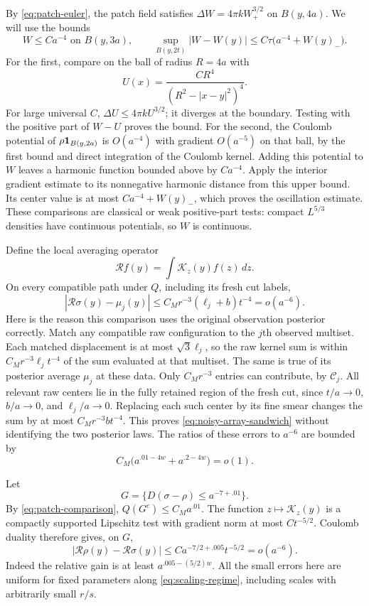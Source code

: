 By \cref{eq:patch-euler}, the patch field satisfies
$\Delta W=4\pi kW_+^{3/2}$ on $B(y,4a)$.  We will use the bounds
\begin{equation}
 W\leq Ca^{-4}\text{ on }B(y,3a),\qquad
 \sup_{B(y,2t)}|W-W(y)|
                       \leq C\tau\bigl(a^{-4}+W(y)_-\bigr).
 \label{eq:patch-field-oscillation}
\end{equation}
For the first, compare on the ball of radius $R=4a$ with
\[
 U(x)=\frac{CR^4}{(R^2-|x-y|^2)^4}.
\]
For large universal $C$, $\Delta U\leq4\pi kU^{3/2}$; it diverges at
the boundary.  Testing with the positive part of $W-U$ proves the bound.
For the second, the Coulomb potential of
$\rho\mathbf 1_{B(y,2a)}$ is $O(a^{-4})$ with gradient $O(a^{-5})$ on that
ball, by the first bound and direct integration of the Coulomb kernel.
Adding this potential to $W$ leaves a harmonic function bounded above
by $Ca^{-4}$.  Apply the interior gradient estimate to its nonnegative
harmonic distance from this upper bound.  Its center value is at most
$Ca^{-4}+W(y)_-$, which proves the oscillation estimate.  These
comparisons are classical or weak positive-part tests: compact
$L^{5/3}$ densities have continuous potentials, so $W$ is continuous.

Define the local averaging operator
\[
 \mathcal R f(y)=\int\mathcal K_z(y)f(z)\,dz.
\]
On every compatible path under $Q$, including its fresh cut labels,
\begin{equation}
 |\mathcal R\sigma(y)-\mu_j(y)|
        \leq C_Mr^{-3}(\ell_j+b)t^{-4}=o(a^{-6}).
 \label{eq:noisy-array-sandwich}
\end{equation}
Here is the reason this comparison uses the original observation
posterior correctly.  Match any compatible raw configuration to the
$j$th observed multiset.  Each matched displacement is at most
$\sqrt3\ell_j$, so the raw kernel sum is within
$C_Mr^{-3}\ell_jt^{-4}$ of the sum evaluated at that multiset.
The same is true of its posterior average $\mu_j$ at these data.
Only $C_Mr^{-3}$ entries can contribute, by $\mathcal C_j$.
All relevant raw centers lie in the fully retained region of the fresh
cut, since $t/a\to0$, $b/a\to0$, and $\ell_j/a\to0$.
Replacing each such center by its fine smear changes the sum by at most
$C_Mr^{-3}bt^{-4}$.  This proves
\cref{eq:noisy-array-sandwich} without identifying the two posterior laws.
The ratios of these errors to $a^{-6}$ are bounded by
\[
 C_M\bigl(a^{.01-4w}+a^{.2-4w}\bigr)=o(1).
\]

Let
\[
 G=\{D(\sigma-\rho)\leq a^{-7+.01}\}.
\]
By \cref{eq:patch-comparison}, $Q(G^c)\leq C_Ma^{.01}$.
The function $z\mapsto\mathcal K_z(y)$ is a compactly supported
Lipschitz test with gradient norm at most $Ct^{-5/2}$.
Coulomb duality \cite[\FCoulomb]{Foundation} therefore gives, on $G$,
\begin{equation}
 |\mathcal R\rho(y)-\mathcal R\sigma(y)|
              \leq Ca^{-7/2+.005}t^{-5/2}=o(a^{-6}).
 \label{eq:local-coulomb-duality}
\end{equation}
Indeed the relative gain is at least $a^{.005-(5/2)w}$.
All the small errors here are uniform for fixed parameters along
\cref{eq:scaling-regime}, including scales with arbitrarily small $r/s$.

